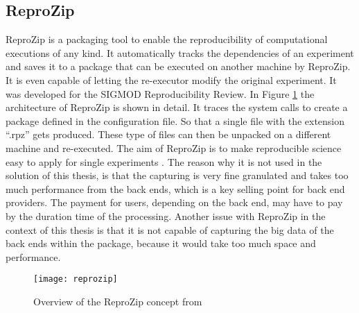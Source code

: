 \documentclass[draft,final]{vutinfth} %
\begin{document}
\subsection{ReproZip}\label{ReproZip}
ReproZip is a packaging tool to enable the reproducibility of computational executions of any kind. It automatically tracks the dependencies of an experiment and saves it to a package that can be executed on another machine by ReproZip. It is even capable of letting the re-executor modify the original experiment. It was developed for the SIGMOD Reproducibility Review. In Figure \ref{fig:reprozip} the architecture of ReproZip is shown in detail. It traces the system calls to create a package defined in the configuration file. So that a single file with the extension “.rpz” gets produced. These type of files can then be unpacked on a different machine and re-executed. The aim of ReproZip is to make reproducible science easy to apply for single experiments \cite{29c5846926a4497d95f276604cb0368c}. The reason why it is not used in the solution of this thesis, is that the capturing is very fine granulated and takes too much performance from the back ends, which is a key selling point for back end providers. The payment for users, depending on the back end, may have to pay by the duration time of the processing. Another issue with ReproZip in the context of this thesis is that it is not capable of capturing the big data of the back ends within the package, because it would take too much space and performance.  

\begin{figure}[h]
	\centering
	\texttt{[image: reprozip]}
	\caption{Overview of the ReproZip concept from \cite{29c5846926a4497d95f276604cb0368c} }
	\label{fig:reprozip} %
\end{figure}
\end{document}
